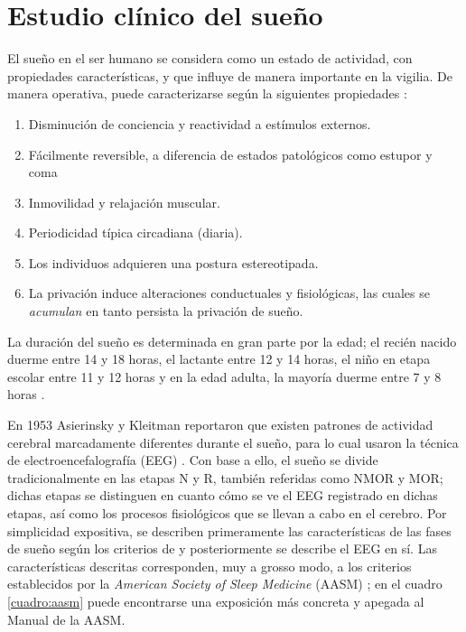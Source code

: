 
\section{Estudio clínico del sueño}
\label{capitulo:psg}

El sueño en el ser humano se considera como un estado de actividad, con propiedades características, y que influye de manera importante en la vigilia.
%
De manera operativa, puede caracterizarse según la siguientes propiedades \cite{CarrilloMora}:
\begin{enumerate}
\item Disminución de conciencia y reactividad a estímulos externos.
\item Fácilmente reversible, a diferencia de estados patológicos como estupor y coma
\item Inmovilidad y relajación muscular.
\item Periodicidad típica circadiana (diaria).
\item Los individuos adquieren una postura estereotipada.
\item La privación induce alteraciones conductuales y fisiológicas, las cuales se \textit{acumulan} en tanto persista la privación de sueño.
\end{enumerate}

La duración del sueño es determinada en gran parte por la edad; el recién nacido duerme entre 14 y 
18 horas, el lactante entre 12 y 14 horas, el niño en etapa escolar entre 11 y 12 horas y en la 
edad adulta, la mayoría duerme entre 7 y 8 horas \cite{Contreras13}.

En 1953 Asierinsky y Kleitman reportaron que existen patrones de actividad cerebral marcadamente diferentes durante el sueño, para lo cual usaron la técnica de electroencefalografía (EEG) \cite{Aserinsky}.
%
Con base a ello, el sueño se divide tradicionalmente en las etapas N y R, también referidas como NMOR y MOR; dichas etapas se distinguen en cuanto cómo se ve el EEG registrado en dichas etapas, así como los procesos fisiológicos que se llevan a cabo en el cerebro.
%
Por simplicidad expositiva, se describen primeramente las características de las fases de sueño según los criterios de y posteriormente se describe el EEG en sí. 
%
Las características descritas corresponden, muy a grosso modo, a los criterios establecidos por la \textit{American Society of Sleep Medicine} (AASM) \cite{AASM07}; en el cuadro \ref{cuadro:aasm} puede encontrarse una exposición más concreta y apegada al Manual de la AASM.

